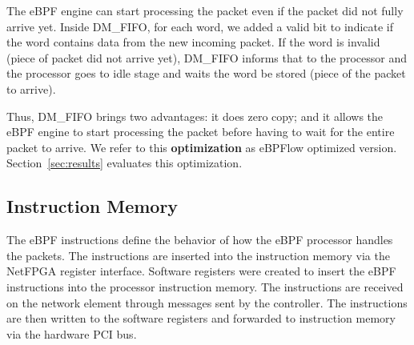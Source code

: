 The eBPF engine can start processing the packet even if the packet did not fully arrive yet.
Inside DM\_FIFO, for each word, we added a valid bit to indicate if the word contains data from the new incoming packet. 
If the word is invalid (piece of packet did not arrive yet), DM\_FIFO informs that to the processor and the processor goes to idle stage and waits the word be stored (piece of the packet to arrive).

Thus, DM\_FIFO brings two advantages: it does zero copy; and it allows the eBPF engine to start processing the packet before having to wait for the entire packet to arrive. 
We refer to this \textbf{optimization} as eBPFlow optimized version.
Section~\ref{sec:results} evaluates this optimization.

\subsection{Instruction Memory} 



The eBPF instructions define the behavior of how the eBPF processor handles the packets. The instructions are inserted into the instruction memory via the NetFPGA register interface. Software registers were created to insert the eBPF instructions into the processor instruction memory. The instructions are received on the network element through messages sent by the controller. The instructions are then written to the software registers and forwarded to instruction memory via the hardware PCI bus.

